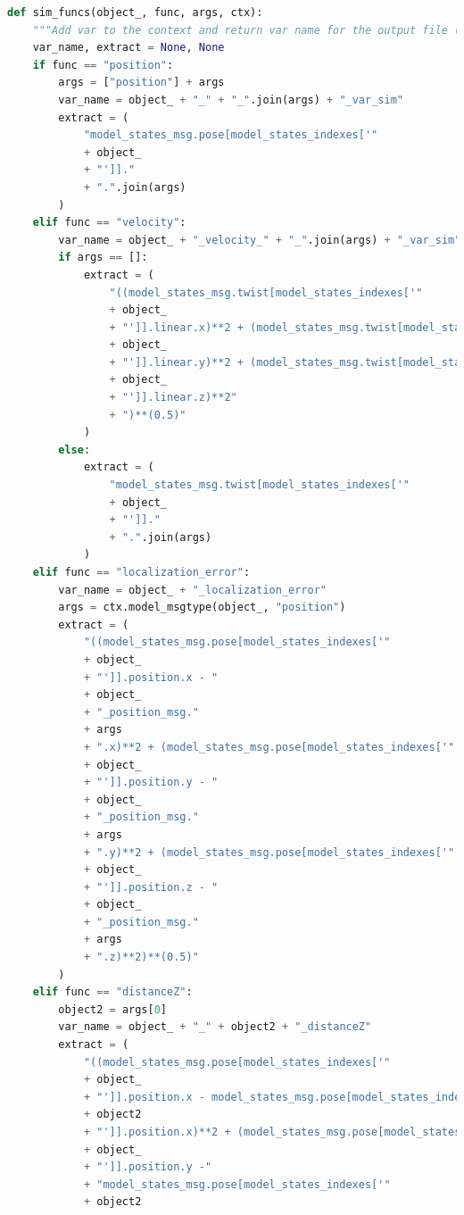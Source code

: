 \begin{lstlisting}[language=Python]
    def sim_funcs(object_, func, args, ctx):
    """Add var to the context and return var name for the output file (Considering the function used)"""
    var_name, extract = None, None
    if func == "position":
        args = ["position"] + args
        var_name = object_ + "_" + "_".join(args) + "_var_sim"
        extract = (
            "model_states_msg.pose[model_states_indexes['"
            + object_
            + "']]."
            + ".".join(args)
        )
    elif func == "velocity":
        var_name = object_ + "_velocity_" + "_".join(args) + "_var_sim"
        if args == []:
            extract = (
                "((model_states_msg.twist[model_states_indexes['"
                + object_
                + "']].linear.x)**2 + (model_states_msg.twist[model_states_indexes['"
                + object_
                + "']].linear.y)**2 + (model_states_msg.twist[model_states_indexes['"
                + object_
                + "']].linear.z)**2"
                + ")**(0.5)"
            )
        else:
            extract = (
                "model_states_msg.twist[model_states_indexes['"
                + object_
                + "']]."
                + ".".join(args)
            )
    elif func == "localization_error":
        var_name = object_ + "_localization_error"
        args = ctx.model_msgtype(object_, "position")
        extract = (
            "((model_states_msg.pose[model_states_indexes['"
            + object_
            + "']].position.x - "
            + object_
            + "_position_msg."
            + args
            + ".x)**2 + (model_states_msg.pose[model_states_indexes['"
            + object_
            + "']].position.y - "
            + object_
            + "_position_msg."
            + args
            + ".y)**2 + (model_states_msg.pose[model_states_indexes['"
            + object_
            + "']].position.z - "
            + object_
            + "_position_msg."
            + args
            + ".z)**2)**(0.5)"
        )
    elif func == "distanceZ":
        object2 = args[0]
        var_name = object_ + "_" + object2 + "_distanceZ"
        extract = (
            "((model_states_msg.pose[model_states_indexes['"
            + object_
            + "']].position.x - model_states_msg.pose[model_states_indexes['"
            + object2
            + "']].position.x)**2 + (model_states_msg.pose[model_states_indexes['"
            + object_
            + "']].position.y -"
            + "model_states_msg.pose[model_states_indexes['"
            + object2

\end{lstlisting}
